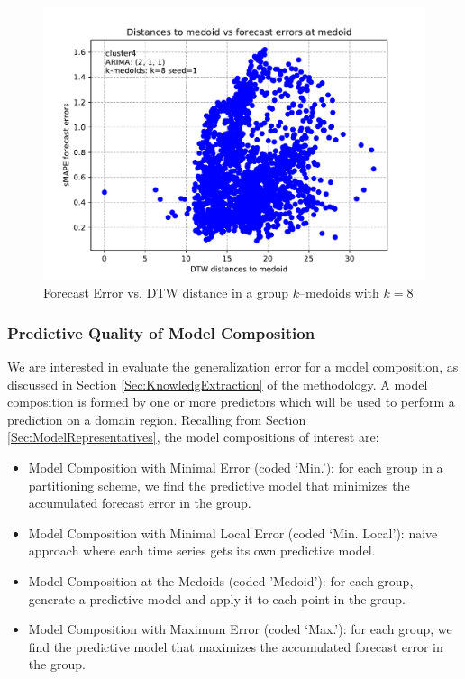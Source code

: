 \begin{figure}[h]
	\centering
	\includegraphics[scale=0.5]{../Figures/auto_arima_distance_error_whole_brazil_1y_1ppd_k8_seed1_cluster4_pdq2-1-1_sMAPE}
	\caption{Forecast Error vs. DTW distance in a group $k$--medoids with $k=8$}
	\label{Fig:DTWvsForecastError}
\end{figure}

\subsubsection{Predictive Quality of Model Composition}
\label{Sec:ModelComposition}

We are interested in evaluate the generalization error for a model composition, as discussed in Section \ref{Sec:KnowledgExtraction} of the methodology. A model composition is formed by one or more predictors which will be used to perform a prediction on a domain region. Recalling from Section \ref{Sec:ModelRepresentatives}, the model compositions of interest are:

\begin{itemize}%
	\item Model Composition with Minimal Error (coded `Min.'): for each group in a partitioning scheme, we find the predictive model that minimizes the accumulated forecast error in the group. 
	\item Model Composition with Minimal Local Error (coded `Min. Local'): naive approach where each time series gets its own predictive model.
	\item Model Composition at the Medoids (coded 'Medoid'): for each group, generate a predictive model and apply it to each point in the group.
	\item Model Composition with Maximum Error (coded `Max.'): for each group, we find the predictive model that maximizes the accumulated forecast error in the group.
\end{itemize}

